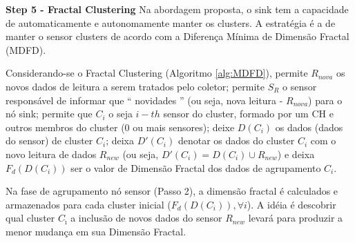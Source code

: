 \documentclass{acm_proc_article-sp}
\begin{document}
{\bf Step 5 - Fractal Clustering}
Na abordagem proposta, o sink tem a capacidade de automaticamente e 
autonomamente manter os clusters. A estratégia é a de manter o sensor 
clusters de acordo com a Diferença Mínima de Dimensão Fractal (MDFD).
\vspace*{-.3cm}

Considerando-se o Fractal Clustering (Algoritmo \ref {alg:MDFD}),
permite $R_{nova}$ os novos dados de leitura a serem tratados pelo coletor;
permite $S_{R}$ o sensor responsável de informar que `` novidades ''
(ou seja, nova leitura - $ R_{nova}$) para o nó sink; permite que $C_i$  o
seja $i-th$ sensor do cluster, formado por um CH e outros membros do cluster
(0 ou mais sensores); deixe $D(C_i)$ os dados (dados do sensor) de 
cluster $C_i$; deixa $D'(C_i)$ denotar os dados do cluster $C_i$ com
o novo leitura de dados $R_{new}$ (ou seja, $D'(C_i) = D(C_i) \cup R_{new}$) 
e deixa $F_{d}(D(C_i))$ ser o valor de Dimensão Fractal dos dados de
agrupamento $C_i$.
\vspace*{-.3cm}

Na fase de agrupamento nó sensor (Passo 2), a dimensão fractal é 
calculados e armazenados para cada cluster inicial 
($F_{d}(D(C_i)), \forall i$). A idéia é descobrir qual cluster
$C_{\hat{\imath}}$ a inclusão de novos dados do sensor $R_{new}$
levará para produzir a menor mudança em sua Dimensão Fractal.
\vspace*{-.3cm}
\end{document}
